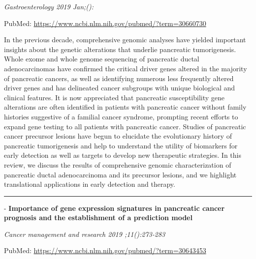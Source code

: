 \documentclass[]{article}
\begin{document}
\emph{Gastroenterology 2019 Jan;():}

PubMed: \url{https://www.ncbi.nlm.nih.gov/pubmed/?term=30660730}

In the previous decade, comprehensive genomic analyses have yielded
important insights about the genetic alterations that underlie
pancreatic tumorigenesis. Whole exome and whole genome sequencing of
pancreatic ductal adenocarcinomas have confirmed the critical driver
genes altered in the majority of pancreatic cancers, as well as
identifying numerous less frequently altered driver genes and has
delineated cancer subgroups with unique biological and clinical
features. It is now appreciated that pancreatic susceptibility gene
alterations are often identified in patients with pancreatic cancer
without family histories suggestive of a familial cancer syndrome,
prompting recent efforts to expand gene testing to all patients with
pancreatic cancer. Studies of pancreatic cancer precursor lesions have
begun to elucidate the evolutionary history of pancreatic tumorigenesis
and help to understand the utility of biomarkers for early detection as
well as targets to develop new therapeutic strategies. In this review,
we discuss the results of comprehensive genomic characterization of
pancreatic ductal adenocarcinoma and its precursor lesions, and we
highlight translational applications in early detection and therapy.

{}

{}

\begin{center}\rule{0.5\linewidth}{\linethickness}\end{center}

 - \textbf{Importance of gene expression signatures in pancreatic cancer
prognosis and the establishment of a prediction model}

\emph{Cancer management and research 2019 ;11():273-283}

PubMed: \url{https://www.ncbi.nlm.nih.gov/pubmed/?term=30643453}
\end{document}
